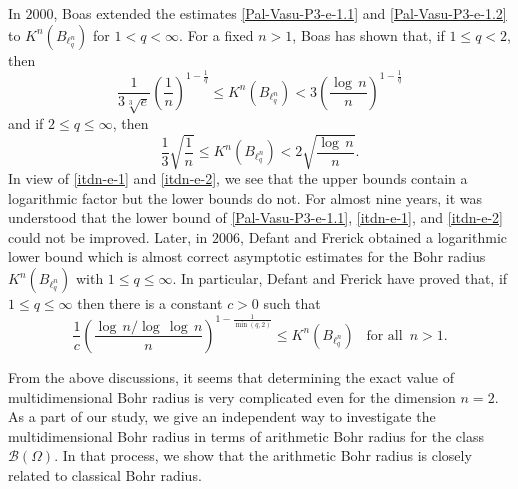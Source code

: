 \documentclass[a4paper,12pt]{amsart}
\theoremstyle{definition}
\newcounter {own}
\begin{document}
In $2000$, Boas \cite{boas-2000} extended the estimates \eqref{Pal-Vasu-P3-e-1.1} and \eqref{Pal-Vasu-P3-e-1.2} to $K^n(B_{\ell^n _q})$ for $1 <q<\infty$. For a fixed $n>1$, Boas \cite{boas-2000} has shown that, if $1\leq q <2$, then 
\begin{equation} \label{itdn-e-1}
	\frac{1}{3\sqrt[3]{e}}\left(\frac{1}{n}\right)^{1-\frac{1}{q}} \leq K^n(B_{\ell^n _q}) < 3 \left(\frac{\log \, n}{n}\right)^{1-\frac{1}{q}}
\end{equation}
and if $2 \leq q \leq \infty$, then
\begin{equation} \label{itdn-e-2}
	\frac{1}{3} \sqrt{\frac{1}{n}} \leq K^n(B_{\ell^n _q}) < 2 \sqrt{\frac{\log\,n}{n}}.
\end{equation}
In view of \eqref{itdn-e-1} and \eqref{itdn-e-2}, we see that the upper bounds contain a logarithmic factor but the lower bounds do not. For almost nine years, it was understood that the lower bound of \eqref{Pal-Vasu-P3-e-1.1}, \eqref{itdn-e-1}, and \eqref{itdn-e-2} could not be improved. Later, in $2006$, Defant and Frerick \cite{defant-2006} obtained a logarithmic lower bound which is almost correct asymptotic estimates for the Bohr radius $K^n(B_{\ell^n _q})$ with $1\leq q \leq \infty$. In particular, Defant and Frerick have proved that, if $1\leq q \leq \infty$ then there is a constant $c>0$ such that 
\begin{equation} \label{itdn-e-3}
	\frac{1}{c} \left(\frac{\log\,n/\log\, \log\,n}{n}\right)^{1-\frac{1}{\min(q,2)}} \leq K^n(B_{\ell^n _q}) \,\,\,\,\, \mbox{for all} \,\,\, n>1.
\end{equation}

\vspace{2mm}

From the above discussions, it seems that determining the exact value of multidimensional Bohr radius is very complicated even for the dimension $n=2$. As a part of our study, we give an independent way to investigate the multidimensional Bohr radius in terms of arithmetic Bohr radius for the class $\mathcal{B}(\Omega)$. In that process, we show that the arithmetic Bohr radius is closely related to classical Bohr radius.\\[1mm]
\end{document}
